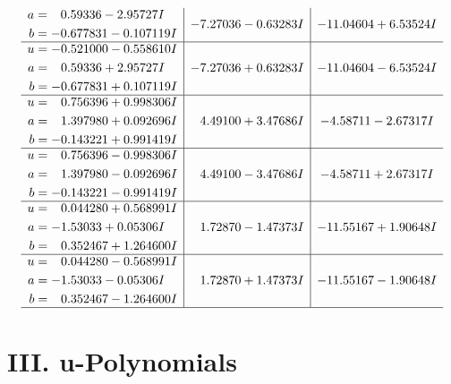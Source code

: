 \documentclass[1p]{elsarticle_modified}
\theoremstyle{definition}
\begin{document}
$$\begin{array}{c|c|c}
\begin{aligned}
a &= \phantom{-}0.59336 - 2.95727 I \\
b &= -0.677831 - 0.107119 I\end{aligned}
 & -7.27036 - 0.63283 I & -11.04604 + 6.53524 I \\ \hline\begin{aligned}
u &= -0.521000 - 0.558610 I \\
a &= \phantom{-}0.59336 + 2.95727 I \\
b &= -0.677831 + 0.107119 I\end{aligned}
 & -7.27036 + 0.63283 I & -11.04604 - 6.53524 I \\ \hline\begin{aligned}
u &= \phantom{-}0.756396 + 0.998306 I \\
a &= \phantom{-}1.397980 + 0.092696 I \\
b &= -0.143221 + 0.991419 I\end{aligned}
 & \phantom{-}4.49100 + 3.47686 I & -4.58711 - 2.67317 I \\ \hline\begin{aligned}
u &= \phantom{-}0.756396 - 0.998306 I \\
a &= \phantom{-}1.397980 - 0.092696 I \\
b &= -0.143221 - 0.991419 I\end{aligned}
 & \phantom{-}4.49100 - 3.47686 I & -4.58711 + 2.67317 I \\ \hline\begin{aligned}
u &= \phantom{-}0.044280 + 0.568991 I \\
a &= -1.53033 + 0.05306 I \\
b &= \phantom{-}0.352467 + 1.264600 I\end{aligned}
 & \phantom{-}1.72870 - 1.47373 I & -11.55167 + 1.90648 I \\ \hline\begin{aligned}
u &= \phantom{-}0.044280 - 0.568991 I \\
a &= -1.53033 - 0.05306 I \\
b &= \phantom{-}0.352467 - 1.264600 I\end{aligned}
 & \phantom{-}1.72870 + 1.47373 I & -11.55167 - 1.90648 I\\
 \hline 
 \end{array}$$\newpage
\newpage\renewcommand{\arraystretch}{1}
\centering \section*{ III. u-Polynomials}
\end{document}
